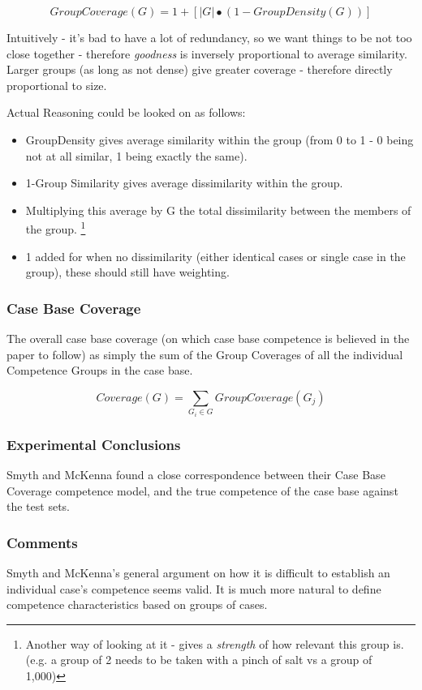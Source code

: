 \documentclass[a4paper,11pt]{report}
\begin{document}
\[
GroupCoverage(G)=1+\left[\left|G\right|\bullet(1-GroupDensity(G))\right]
\]

Intuitively - it's bad to have a lot of redundancy, so we want things to be not too close together - therefore \emph{goodness} is inversely proportional to average similarity. Larger groups (as long as not dense) give greater coverage - therefore directly proportional to size.

Actual Reasoning could be looked on as follows:
\begin{itemize}
	\item GroupDensity gives average similarity within the group (from 0 to 1 - 0 being not at all similar, 1 being exactly the same).
	\item 1-Group Similarity gives average dissimilarity within the group.
	\item Multiplying this average by G the total dissimilarity between the members of the group. \footnote{Another way of looking at it - gives a \emph{strength} of how relevant this group is. (e.g. a group of 2 needs to be taken with a pinch of salt vs a group of 1,000)}
	\item 1 added for when no dissimilarity (either identical cases or single case in the group), these should still have weighting.
\end{itemize}

\subsubsection{Case Base Coverage}
The overall case base coverage (on which case base competence is believed in the paper to follow) as simply the sum of the Group Coverages of all the individual Competence Groups in the case base.

\[
Coverage(G)=\underset{G_{i}\in G}{\sum}GroupCoverage(G_{j})
\]

\subsubsection{Experimental Conclusions}
Smyth and McKenna found a close correspondence between their Case Base Coverage competence model, and the true competence of the case base against the test sets\cite{Smyth1998}.

\subsubsection{Comments}
Smyth and McKenna's general argument on how it is difficult to establish an individual case's competence seems valid. It is much more natural to define competence characteristics based on groups of cases. 
\end{document}
